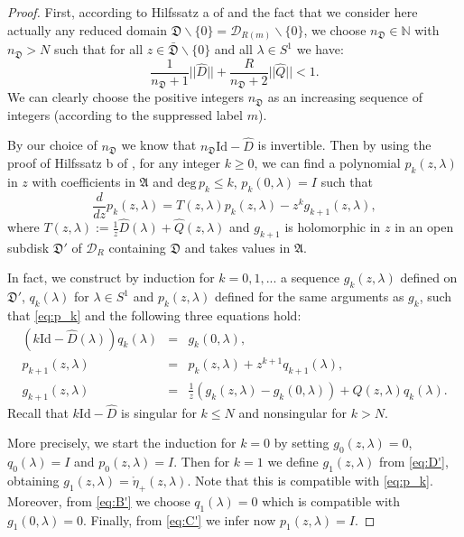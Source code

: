 \documentclass[a4paper,11pt]{amsart}
\theoremstyle{definition}
\numberwithin{equation}{section}
\begin{document}
\begin{proof}
First, according  to Hilfssatz a of  \cite{Sch-Sch}  and the  fact that we consider here actually  
any reduced domain $\mathfrak{D} \backslash\{0\}   = \mathcal{D}_{R(m)} \backslash\{0\}$, 
 we choose $n_\mathfrak{D} \in \mathbb{N}$ with  $n_\mathfrak{D} >N$ such that
for all $z\in \bar{\mathfrak{D}} \backslash\{0\} $ and all $\lambda \in S^1$ we have:
\begin{equation}\label{eq:n_D}
\frac{1}{n_{\mathfrak{D}} +1} ||\hat{D}||+\frac{R}{n_\mathfrak{D}+2}||\hat{Q}||<1.
\end{equation}
We can clearly choose the positive integers $n_\mathfrak{D}$ as an increasing sequence of integers (according to the suppressed label $m$). 

By our choice of $n_\mathfrak{D}$ we know that $n_\mathfrak{D} \mathrm{Id}-\hat{D}$ is invertible. 
Then by using the proof of Hilfssatz b of  \cite{Sch-Sch}, for any integer  $k \geq 0$, 
we can find a polynomial $p_{k}(z,\lambda)$  in $z$ with coefficients in $\mathfrak{A}$ 
and $\mathrm{deg}\, p_{k}\leq k$, $p_{k}(0,\lambda) = I$ such that
\begin{equation}\label{eq:p_k}
\frac{d}{dz}p_{k}(z,\lambda)= T(z,\lambda) p_{k}(z,\lambda)-z^{k} g_{k+1}(z,\lambda),
\end{equation}
where $T(z,\lambda):=\frac{1}{z}\hat{D}(\lambda)+\hat{Q}(z,\lambda)$ and $g_{k+1}$ is 
holomorphic in $z$ in an open subdisk $\mathfrak{D}'$ of $\mathcal{D}_R$ containing 
$\mathfrak{D}$ and takes  values in  $\mathfrak{A}$. 


In fact, we construct by induction for $ k = 0,1,...$ a sequence $g_k(z, \lambda)$ defined on $\mathfrak{D}'$,
$q_k(\lambda)$ for $\lambda \in S^1$ and $p_k(z, \lambda)$ defined for the same arguments as $g_k$,
such that \eqref{eq:p_k} and the following three equations hold:
\begin{eqnarray}
(k\mathrm{Id}-\hat{D}(\lambda))q_k (\lambda)&=&g_k(0,\lambda), \label{eq:B'}\\
p_{k+1}(z,\lambda)&=&p_{k}(z,\lambda)+z^{k+1} q_{k+1}(\lambda), \label{eq:C'}\\
g_{k+1}(z,\lambda)&=&\frac{1}{z}(g_k(z,\lambda)-g_k(0,\lambda))+\hat{Q}(z,\lambda) q_k(\lambda). \label{eq:D'}
\end{eqnarray}
Recall that $k \mathrm{Id}-\hat{D}$ is singular  for  $k \leq N$ and nonsingular for $k > N$. 
 
More precisely, we start the induction for $k = 0$ by setting  $g_0(z,\lambda) = 0$, 
 $q_0 (\lambda) = I$ and
 $p_0(z, \lambda) = I$. 
 Then for $k= 1$
  we define  $g_1(z, \lambda)$ from \eqref{eq:D'}, obtaining  
  $g_1(z, \lambda)  = \mathring{\eta}_+(z, \lambda)$.
 Note that this is compatible with \eqref{eq:p_k}.  Moreover, 
from \eqref{eq:B'} we  choose 
$q_1(\lambda)=0$  which is compatible with    $g_1(0,\lambda)=0.$ 
Finally, from \eqref{eq:C'} we infer now
$p_1(z,\lambda)=I.$



\end{proof}
\end{document}
